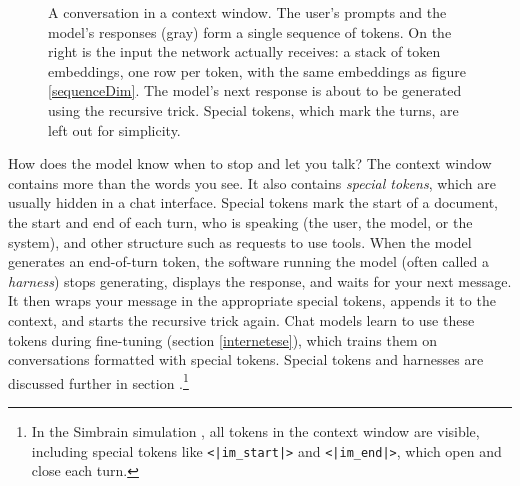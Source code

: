 \begin{figure}[ht]
\centering
{}
\caption[Jeff Yoshimi.]{A conversation in a context window. The user's prompts
and the model's responses (gray) form a single sequence of tokens. On the right
is the input the network actually receives: a stack of token embeddings, one
row per token, with the same embeddings as figure \ref{sequenceDim}. The model's
next response is about to be generated using the recursive trick. Special
tokens, which mark the turns, are left out for simplicity.}
\label{chatContext}
\end{figure}

How does the model know when to stop and let you talk? The context window
contains more than the words you see. It also contains \emph{special tokens},
which are usually hidden in a chat interface. Special tokens mark the start of
a document, the start and end of each turn, who is speaking (the user, the
model, or the system), and other structure such as requests to use tools. When
the model generates an end-of-turn token, the software running the model (often
called a \emph{harness}) stops generating, displays the response, and waits for
your next message. It then wraps your message in the appropriate special tokens,
appends it to the context, and starts the recursive trick again. Chat models
learn to use these tokens during fine-tuning (section \ref{internetese}), which
trains them on conversations formatted with special tokens. Special tokens and
harnesses are discussed further in section .\footnote{In
the Simbrain simulation
, all tokens in the context window are visible, including special
tokens like \texttt{<|im\_start|>} and \texttt{<|im\_end|>}, which open and
close each turn.}

